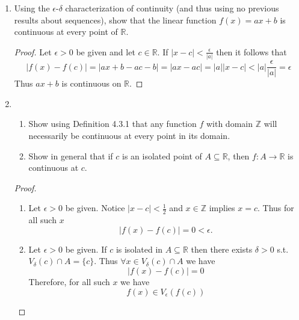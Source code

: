 \begin{enumerate}
\begin{proof}
\begin{enumerate}
        \item Let \( (x_{n}) \rightarrow c \) with \( x_{n} \in A \). Since \( f \) is continuous at \( c \), it follows \( f(x_{n}) \rightarrow f(c) \). But then, by continuity of \( g \) at \( f(c) \) it follows \( g(f(x_{n})) \rightarrow g(f(c)) \). 
    \end{enumerate}
    \end{proof}
    
    \item Using the \( \epsilon \)-\( \delta \) characterization of continuity (and thus using no previous results about sequences), show that the linear function \( f(x) = ax+b \) is continuous at every point of \( \mathbb{R} \). 
    \begin{proof}
    Let \( \epsilon > 0 \) be given and let \( c \in \mathbb{R} \). If \( \vert x - c \vert < \frac{\epsilon}{\vert a \vert} \) then it follows that
    \[
    \vert f(x) - f(c) \vert = \vert ax+b -ac-b \vert = \vert ax - ac \vert = \vert a \vert \vert x - c \vert < \vert a \vert \frac{\epsilon}{\vert a \vert} = \epsilon
    \]
    Thus \( ax+b \) is continuous on \( \mathbb{R} \). 
    \end{proof}
    
    \item \begin{enumerate}
    \item Show using Definition 4.3.1 that any function \( f \) with domain \( \mathbb{Z} \) will necessarily be continuous at every point in its domain.
    
    \item Show in general that if \( c \) is an isolated point of \( A \subseteq \mathbb{R} \), then \( f:A \rightarrow \mathbb{R} \) is continuous at \(c \).
    \end{enumerate}
    
    \begin{proof}
    \begin{enumerate}
        \item Let \( \epsilon > 0 \) be given. Notice \( \vert x-c \vert < \frac{1}{2} \) and \( x \in \mathbb{Z} \) implies \( x=c \). Thus for all such \( x \)
        \[
        \vert f(x) - f(c) \vert = 0 < \epsilon.
        \]
        
        \item Let \( \epsilon > 0 \) be given. If \( c \) is isolated in \( A \subseteq \mathbb{R} \) then there exists \( \delta > 0 \) s.t. \( V_{\delta}(c) \cap A = \{ c \} \). Thus \( \forall x \in V_{\delta}(c) \cap A \) we have
        \[
        \vert f(x) - f(c) \vert = 0
        \]
        Therefore, for all such \( x \) we have
        \[
        f(x) \in V_{\epsilon}(f(c))
        \]
    \end{enumerate}
    \end{proof}
    

\end{enumerate}
